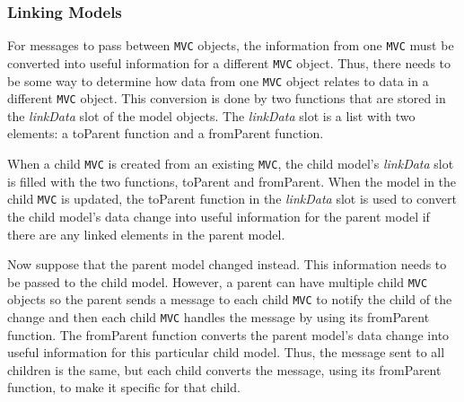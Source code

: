 \documentclass[11pt]{article}
\newcommand{\Rfunction}[1]{{\textsf{#1}}}
\newcommand{\Robject}[1]{{\texttt{#1}}}
\newcommand{\Rslot}[1]{\textsl{#1}}
\begin{document}
\subsubsection{Linking Models}
\label{Sssec:MultLink}

For messages to pass between \Robject{MVC} objects, the information from one
\Robject{MVC} must be converted into useful information for a different
\Robject{MVC} object.  Thus, there needs to be some way to determine how data
from one \Robject{MVC} object relates to data in a different \Robject{MVC}
object.  This conversion is done by two functions that are stored in the
\Rslot{linkData} slot of the model objects.  The \Rslot{linkData}
slot is a list with two elements: a \Rfunction{toParent} function and a
\Rfunction{fromParent} function. 

When a child \Robject{MVC} is created from an existing \Robject{MVC}, the
child model's \Rslot{linkData} slot is filled with the two functions,
\Rfunction{toParent} and \Rfunction{fromParent}.  When the model in
the child \Robject{MVC} is updated, the \Rfunction{toParent} function in the
\Rslot{linkData} slot is used to convert the child model's data
change into useful information for the parent model if there are any linked
elements in the parent model.  

Now suppose that the parent model changed instead.  This information
needs to be passed to the child model.  However, a parent can have
multiple child \Robject{MVC} objects so the parent sends a message to
each child \Robject{MVC} to notify the child of the change and then
each child \Robject{MVC} handles the message by using its
\Rfunction{fromParent} function.  The \Rfunction{fromParent} function
converts the parent model's data change into useful information for
this particular child model.  Thus, the message sent to all children is the
same, but each child converts the message, using its \Rfunction{fromParent}
function, to make it specific for that child.
\end{document}
